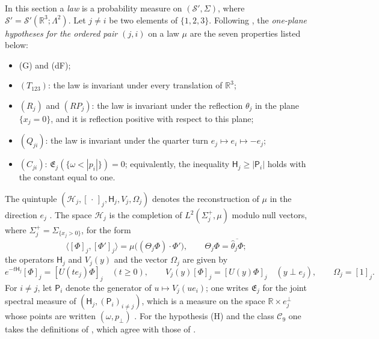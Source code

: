 \documentclass[11pt]{amsart}
\theoremstyle{definition}
\begin{document}
In this section a \emph{law} is a probability measure on $(\mathcal S',\Sigma)$, where $\mathcal S'=\mathcal S'(\mathbb R^3;\Lambda^2)$.
Let $j\ne i$ be two elements of $\{1,2,3\}$.
Following \cite[Definition~14.2\,(f)]{QEDII}, the \emph{one-plane hypotheses for the ordered pair $(j,i)$} on a law $\mu$ are the seven properties listed below:
\begin{itemize}
\item (G) and (dF);
\item $(T_{123})$: the law is invariant under every translation of $\mathbb R^3$;
\item $(R_j)$ and $(RP_j)$: the law is invariant under the reflection $\theta_j$ in the plane $\{x_j=0\}$, and it is reflection positive with respect to this plane;
\item $(Q_{ji})$: the law is invariant under the quarter turn $e_j\mapsto e_i\mapsto-e_j$;
\item $(C_{ji})$: $\mathfrak E_j(\{\omega<|p_i|\})=0$; equivalently, the inequality $\mathsf H_j\ge|\mathsf P_i|$ holds with the constant equal to one.
\end{itemize}
The quintuple $(\mathcal H_j,[\,\cdot\,]_j,\mathsf H_j,V_j,\Omega_j)$ denotes the reconstruction of $\mu$ in the direction $e_j$ \cite[Definition~2.38]{QEDII}.
The space $\mathcal H_j$ is the completion of $L^2(\Sigma_j^+,\mu)$ modulo null vectors, where $\Sigma_j^+=\Sigma_{\{x_j>0\}}$, for the form
\begin{equation*}
\langle[\Phi]_j,[\Phi']_j\rangle=\mu\big((\Theta_j\Phi)\cdot\Phi'\big),\qquad\Theta_j\Phi=\overline{\hat\theta_j\Phi};
\end{equation*}
the operators $\mathsf H_j$ and $V_j(y)$ and the vector $\Omega_j$ are given by
\begin{equation*}
e^{-t\mathsf H_j}[\Phi]_j=[U(te_j)\Phi]_j\quad(t\ge0),\qquad V_j(y)[\Phi]_j=[U(y)\Phi]_j\quad(y\perp e_j),\qquad\Omega_j=[1]_j.
\end{equation*}
For $i\ne j$, let $\mathsf P_i$ denote the generator of $u\mapsto V_j(ue_i)$; one writes $\mathfrak E_j$ for the joint spectral measure of $(\mathsf H_j,(\mathsf P_i)_{i\ne j})$, which is a measure on the space $\mathbb R\times e_j^\perp$ whose points are written $(\omega,p_\perp)$ \cite[Lemma~12.18\,(b)]{QEDII}.
For the hypothesis (H) and the class $\mathcal C_9$ one takes the definitions of \cite[Definition~2.38]{QEDII}, which agree with those of \cite{QEDIII}.
\end{document}
